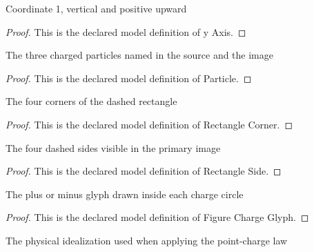 \begin{definition}[y Axis]
  \label{def:physics:phyx-mini-0890:phyxminiproblems-problemphyxmini0890-yaxis}
  Coordinate 1, vertical and positive upward
\end{definition}
\begin{proof}
  This is the declared model definition of y Axis.
\end{proof}
\begin{definition}[Particle]
  \label{def:physics:phyx-mini-0890:phyxminiproblems-problemphyxmini0890-particle}
  The three charged particles named in the source and the image
\end{definition}
\begin{proof}
  This is the declared model definition of Particle.
\end{proof}
\begin{definition}
  \label{def:physics:phyx-mini-0890:phyxminiproblems-problemphyxmini0890-rectanglecorner}
  The four corners of the dashed rectangle
\end{definition}
\begin{proof}
  This is the declared model definition of Rectangle Corner.
\end{proof}
\begin{definition}
  \label{def:physics:phyx-mini-0890:phyxminiproblems-problemphyxmini0890-rectangleside}
  The four dashed sides visible in the primary image
\end{definition}
\begin{proof}
  This is the declared model definition of Rectangle Side.
\end{proof}
\begin{definition}
  \label{def:physics:phyx-mini-0890:phyxminiproblems-problemphyxmini0890-figurechargeglyph}
  The plus or minus glyph drawn inside each charge circle
\end{definition}
\begin{proof}
  This is the declared model definition of Figure Charge Glyph.
\end{proof}
\begin{definition}
  \label{def:physics:phyx-mini-0890:phyxminiproblems-problemphyxmini0890-chargedparticlemodel}
  The physical idealization used when applying the point-charge law
\end{definition}
